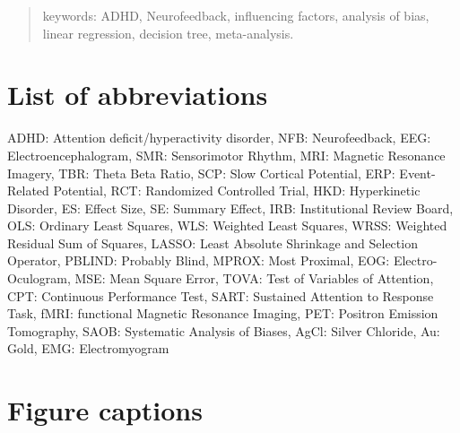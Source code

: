 \documentclass[12pt,a4paper,english]{article}
\begin{document}


\clearpage

\begin{abstract}

\vskip 0.2in
\noindent keywords: ADHD, Neurofeedback, influencing factors, analysis of bias, linear regression, decision tree, meta-analysis.
\end{abstract}









\section*{List of abbreviations} 
ADHD: Attention deficit/hyperactivity disorder,
NFB: Neurofeedback,
EEG: Electroencephalogram,
SMR: Sensorimotor Rhythm,
MRI: Magnetic Resonance Imagery,
TBR: Theta Beta Ratio,
SCP: Slow Cortical Potential,
ERP: Event-Related Potential,
RCT: Randomized Controlled Trial,
HKD: Hyperkinetic Disorder,
ES: Effect Size,
SE: Summary Effect,
IRB: Institutional Review Board,
OLS: Ordinary Least Squares,
WLS: Weighted Least Squares,
WRSS: Weighted Residual Sum of Squares,
LASSO: Least Absolute Shrinkage and Selection Operator,
PBLIND: Probably Blind,
MPROX: Most Proximal,
EOG: Electro-Oculogram,
MSE: Mean Square Error,
TOVA: Test of Variables of Attention,
CPT: Continuous Performance Test,
SART: Sustained Attention to Response Task,
fMRI: functional Magnetic Resonance Imaging,
PET: Positron Emission Tomography,
SAOB: Systematic Analysis of Biases,
AgCl: Silver Chloride,
Au: Gold,
EMG: Electromyogram 

\clearpage



\clearpage

\section*{Figure captions}
\end{document}
